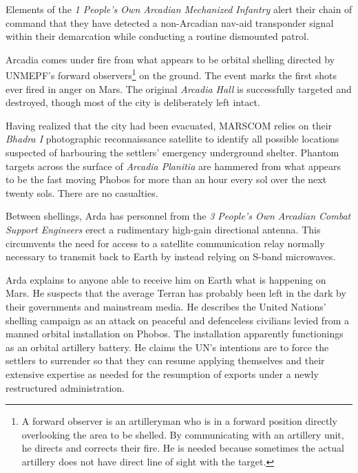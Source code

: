 

Elements of the {\it 1 People's Own Arcadian Mechanized Infantry} alert their chain of command that they have detected a non-Arcadian nav-aid transponder signal within their demarcation while conducting a routine dismounted patrol.
\StopTimelineDate

Arcadia comes under fire from what appears to be orbital shelling directed by UNMEPF's forward observers\footnote{A forward observer is an artilleryman who is in a forward position directly overlooking the area to be shelled. By communicating with an artillery unit, he directs and corrects their fire. He is needed because sometimes the actual artillery does not have direct line of sight with the target.} on the ground. The event marks the first shots ever fired in anger on Mars. The original {\it Arcadia Hall} is successfully targeted and destroyed, though most of the city is deliberately left intact. 

Having realized that the city had been evacuated, MARSCOM relies on their {\it Bhadra I} photographic reconnaissance satellite to identify all possible locations suspected of harbouring the settlers' emergency underground shelter. Phantom targets across the surface of {\it Arcadia Planitia} are hammered from what appears to be the fast moving Phobos for more than an hour every sol over the next twenty sols. There are no casualties.

Between shellings, Arda has personnel from the {\it 3 People's Own Arcadian Combat Support Engineers} erect a rudimentary high-gain directional antenna. This circumvents the need for access to a satellite communication relay normally necessary to transmit back to Earth by instead relying on S-band microwaves. 

Arda explains to anyone able to receive him on Earth what is happening on Mars. He suspects that the average Terran has probably been left in the dark by their governments and mainstream media. He describes the United Nations' shelling campaign as an attack on peaceful and defenceless civilians levied from a manned orbital installation on Phobos. The installation apparently functionings as an orbital artillery battery. He claims the UN's intentions are to force the settlers to surrender so that they can resume applying themselves and their extensive expertise as needed for the resumption of exports under a newly restructured administration.


